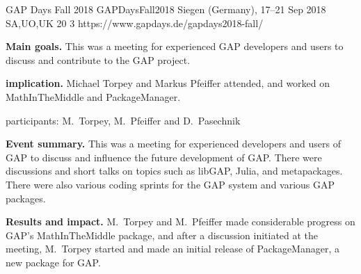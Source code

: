 \begin{event}{GAP Days Fall 2018}
  {GAPDaysFall2018}
  {Siegen (Germany), 17--21 Sep 2018}
  {SA,UO,UK}
  {20}
  {3}
  {https://www.gapdays.de/gapdays2018-fall/}
  
\textbf{Main goals.} This was a meeting for experienced GAP developers and users
to discuss and contribute to the GAP project.

\textbf{\ODK implication.} Michael Torpey and Markus Pfeiffer attended, and
worked on MathInTheMiddle and PackageManager.

\ODK participants: M.~Torpey, M.~Pfeiffer and D.~Pasechnik

\textbf{Event summary.} This was a meeting for experienced developers and users
of GAP to discuss and influence the future development of GAP.  There were
discussions and short talks on topics such as libGAP, Julia, and metapackages.
There were also various coding sprints for the GAP system and various GAP
packages.

\textbf{Results and impact.} M.~Torpey and M.~Pfeiffer made considerable
progress on GAP's MathInTheMiddle package, and after a discussion initiated at
the meeting, M.~Torpey started and made an initial release of PackageManager, a
new package for GAP.

\end{event}
